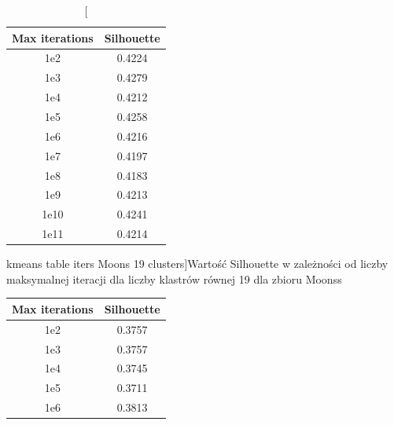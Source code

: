 \documentclass{classrep}
\begin{document}
{{\begin{table}[!htbp]
                \hfill
                \begin{minipage}{.48\textwidth}
                    \centering
                    \begin{tabular}{|c|c|}
                        \hline
                        Max iterations & Silhouette \\ \hline
                        1e2 & 0.4224 \\ \hline
                        1e3 & 0.4279 \\ \hline
                        1e4 & 0.4212 \\ \hline
                        1e5 & 0.4258 \\ \hline
                        1e6 & 0.4216 \\ \hline
                        1e7 & 0.4197 \\ \hline
                        1e8 & 0.4183 \\ \hline
                        1e9 & 0.4213 \\ \hline
                        1e10 & 0.4241 \\ \hline
                        1e11 & 0.4214 \\ \hline
                    \end{tabular}
                    \caption
                    [kmeans table iters Moons 19 clusters]{Wartość Silhouette w
                    zależności od liczby maksymalnej iteracji dla liczby klastrów
                    równej 19 dla zbioru Moonss}
                    \label{kmeans_table_iters_Moons_19_clusters}
                \end{minipage}
                \hfill
            \end{table}
            \FloatBarrier
            \begin{table}[!htbp]
                \begin{minipage}{.5\textwidth}
                    \centering
                    \begin{tabular}{|c|c|}
                        \hline
                        Max iterations & Silhouette \\ \hline
                        1e2 & 0.3757 \\ \hline
                        1e3 & 0.3757 \\ \hline
                        1e4 & 0.3745 \\ \hline
                        1e5 & 0.3711 \\ \hline
                        1e6 & 0.3813 \\ \hline

\end{tabular}
\end{minipage}
\end{table}}}
\end{document}
